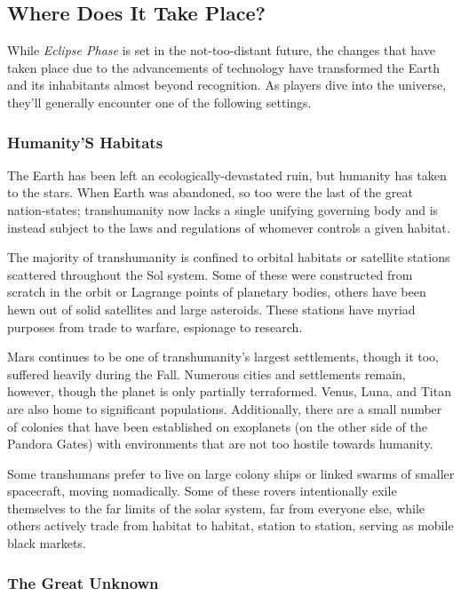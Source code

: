 \subsection{Where Does It Take Place?}

While  \textit{Eclipse Phase} is set in the not-too-distant 
future, the changes that have taken place due to the 
advancements of technology have transformed the 
Earth and its inhabitants almost beyond recognition. 
As players dive into the universe, they'll generally 
encounter one of the following settings.

\subsubsection{Humanity'S Habitats}

The Earth has been left an ecologically-devastated 
ruin, but humanity has taken to the stars. When 
Earth was abandoned, so too were the last of the 
great nation-states; transhumanity now lacks 
a single unifying governing body and is instead 
subject to the laws and regulations of whomever 
controls a given habitat.

The majority of transhumanity is confined to 
orbital habitats or satellite stations scattered 
throughout the Sol system. Some of these were 
constructed from scratch in the orbit or Lagrange 
points of planetary bodies, others have been hewn 
out of solid satellites and large asteroids. These stations
have myriad purposes from trade to warfare,
espionage to research.

Mars continues to be one of transhumanity's 
largest settlements, though it too, suffered heavily 
during the Fall. Numerous cities and settlements 
remain, however, though the planet is only partially 
terraformed. Venus, Luna, and Titan are also home 
to significant populations. Additionally, there are a 
small number of colonies that have been established 
on exoplanets (on the other side of the Pandora 
Gates) with environments that are not too hostile 
towards humanity.

Some transhumans prefer to live on large colony 
ships or linked swarms of smaller spacecraft, moving 
nomadically. Some of these rovers intentionally exile 
themselves to the far limits of the solar system, far 
from everyone else, while others actively trade from 
habitat to habitat, station to station, serving as 
mobile black markets.

\subsubsection{The Great Unknown}

